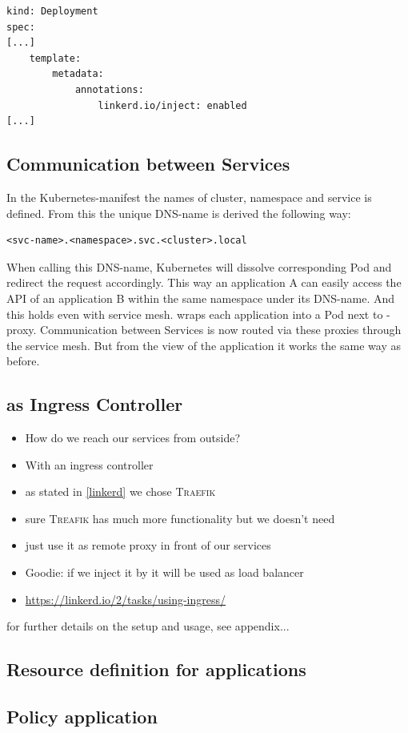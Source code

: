 \begin{lstlisting}[language=bash,caption={Extract of a Kubernetes manifest annotated by \textsc{Linkerd}.}, label={lst:linkerd-annotation}]
kind: Deployment
spec:
[...]
	template:
		metadata:
			annotations:
				linkerd.io/inject: enabled
[...]				
\end{lstlisting}
 
\subsection{Communication between Services}

In the Kubernetes-manifest the names of cluster, namespace and service is defined.
From this the unique DNS-name is derived the following way:

\begin{lstlisting}[caption={DNS-name of a local service in Kubernetes.}, label={lst:k8s-dns}]
<svc-name>.<namespace>.svc.<cluster>.local
\end{lstlisting}

When calling this DNS-name, Kubernetes will dissolve corresponding Pod and redirect the request accordingly.
This way an application A can easily access the API of an application B within the same namespace under its DNS-name.
And this holds even with service mesh.
\linkerd{} wraps each application into a Pod next to \linkerd{}-proxy.
Communication between Services is now routed via these proxies through the service mesh.
But from the view of the application it works the same way as before.

\subsection{\traefik{} as Ingress Controller}

\begin{itemize}
	\item How do we reach our services from outside?
	\item With an ingress controller
	\item as stated in \autoref{linkerd} we chose \textsc{Traefik}
	\item sure \textsc{Treafik} has much more functionality but we doesn't need
	\item just use it as remote proxy in front of our services
	\item Goodie: if we inject it by \linkerd{} it will be used as load balancer\\
	\item \url{https://linkerd.io/2/tasks/using-ingress/}
\end{itemize}

for further details on the setup and usage, see appendix...

\subsection{Resource definition for applications}

\subsection{Policy application}